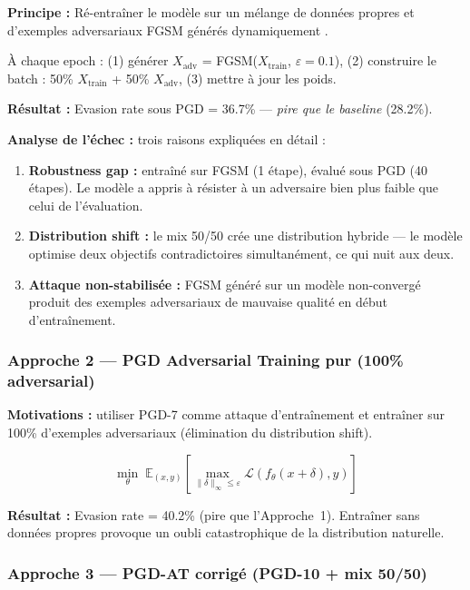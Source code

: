 \documentclass[11pt,a4paper]{article}
\begin{document}
\textbf{Principe :} R\'e-entra\^iner le mod\`ele sur un m\'elange de donn\'ees propres et
d'exemples adversariaux FGSM g\'en\'er\'es dynamiquement \cite{madry2018}.

\`A chaque epoch : (1) g\'en\'erer $X_{\text{adv}}$ = FGSM($X_{\text{train}}$, $\varepsilon=0.1$),
(2) construire le batch : 50\% $X_{\text{train}}$ + 50\% $X_{\text{adv}}$, (3) mettre \`a jour les poids.

\textbf{R\'esultat :} Evasion rate sous PGD = \alert{36.7\%} --- \emph{pire que le baseline} (28.2\%).

\textbf{Analyse de l'\'echec :} trois raisons expliqu\'ees en d\'etail :
\begin{enumerate}[leftmargin=1.5em, noitemsep]
    \item \textbf{Robustness gap :} entra\^in\'e sur FGSM (1 \'etape), \'evalu\'e sous PGD (40 \'etapes).
    Le mod\`ele a appris \`a r\'esister \`a un adversaire bien plus faible que celui de l'\'evaluation.
    \item \textbf{Distribution shift :} le mix 50/50 cr\'ee une distribution hybride --- le mod\`ele
    optimise deux objectifs contradictoires simultan\'ement, ce qui nuit aux deux.
    \item \textbf{Attaque non-stabilis\'ee :} FGSM g\'en\'er\'e sur un mod\`ele non-converg\'e produit
    des exemples adversariaux de mauvaise qualit\'e en d\'ebut d'entra\^inement.
\end{enumerate}

\subsubsection*{Approche 2 --- PGD Adversarial Training pur (100\% adversarial)}

\textbf{Motivations :} utiliser PGD-7 comme attaque d'entra\^inement et entra\^iner sur 100\%
d'exemples adversariaux (\'elimination du distribution shift).

\[
\min_\theta\; \mathbb{E}_{(x,y)}\!\left[\max_{\|\delta\|_\infty \leq \varepsilon} \mathcal{L}(f_\theta(x+\delta), y)\right]
\]

\textbf{R\'esultat :} Evasion rate = \alert{40.2\%} (pire que l'Approche~1).
Entra\^iner sans donn\'ees propres provoque un oubli catastrophique de la distribution naturelle.

\subsubsection*{Approche 3 --- PGD-AT corrig\'e (PGD-10 + mix 50/50)}
\end{document}
